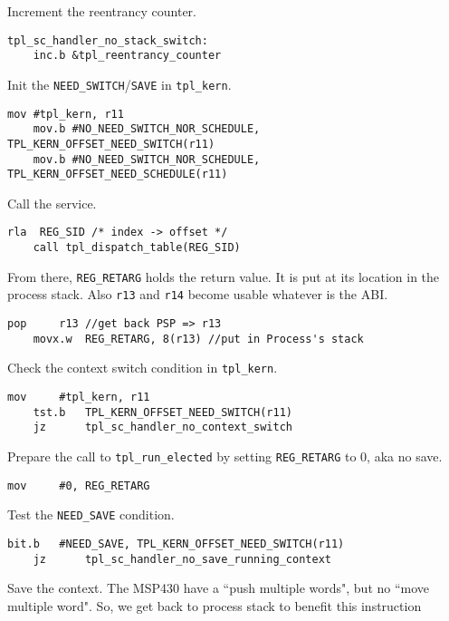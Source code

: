 \documentclass[11pt, oneside]{article}   	%
\begin{document}
Increment the reentrancy counter.

\begin{lstlisting}[backgroundcolor=\color{red!15}]
tpl_sc_handler_no_stack_switch:
    inc.b &tpl_reentrancy_counter
\end{lstlisting}

Init the \lstinline{NEED_SWITCH}/\lstinline{SAVE} in \lstinline{tpl_kern}.

\begin{lstlisting}[backgroundcolor=\color{red!15}]
    mov #tpl_kern, r11
    mov.b #NO_NEED_SWITCH_NOR_SCHEDULE, TPL_KERN_OFFSET_NEED_SWITCH(r11)
    mov.b #NO_NEED_SWITCH_NOR_SCHEDULE, TPL_KERN_OFFSET_NEED_SCHEDULE(r11)
\end{lstlisting}

Call the service.

\begin{lstlisting}[backgroundcolor=\color{red!15}]
    rla  REG_SID /* index -> offset */
    call tpl_dispatch_table(REG_SID)
\end{lstlisting}

From there, \lstinline{REG_RETARG} holds the return value. It is put at its location in the process stack. Also \lstinline{r13} and \lstinline{r14} become usable whatever is the ABI.

\begin{lstlisting}[backgroundcolor=\color{red!15}]
    pop	    r13 //get back PSP => r13
    movx.w  REG_RETARG, 8(r13) //put in Process's stack
\end{lstlisting}

Check the context switch condition in \lstinline{tpl_kern}.
\begin{lstlisting}[backgroundcolor=\color{red!15}]
    mov     #tpl_kern, r11
    tst.b   TPL_KERN_OFFSET_NEED_SWITCH(r11)
    jz      tpl_sc_handler_no_context_switch
\end{lstlisting}

Prepare the call to \lstinline{tpl_run_elected} by setting \lstinline{REG_RETARG} to 0, aka no save.
\begin{lstlisting}[backgroundcolor=\color{red!15}]
    mov     #0, REG_RETARG
\end{lstlisting}

Test the \lstinline{NEED_SAVE} condition.

\begin{lstlisting}[backgroundcolor=\color{red!15}]
    bit.b   #NEED_SAVE, TPL_KERN_OFFSET_NEED_SWITCH(r11)
    jz      tpl_sc_handler_no_save_running_context
\end{lstlisting}
Save the context. The MSP430 have a ``push multiple words", but no ``move multiple word". So, we get back to process stack to benefit this instruction
\end{document}

